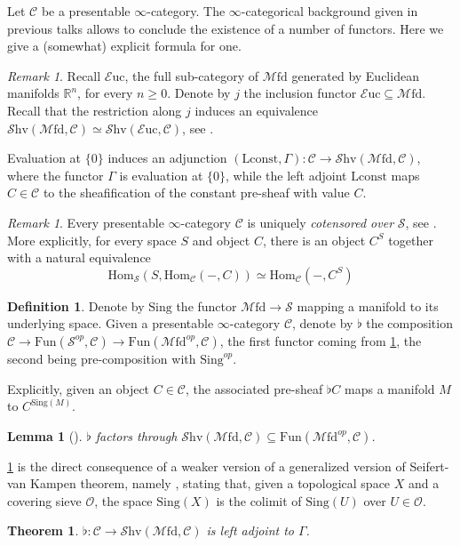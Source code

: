 \documentclass[10pt]{amsart}
\newcommand{\C}{\mathscr{C}}
\newcommand{\s}{\mathscr{S}}
\newcommand{\bR}{\mathbb{R}}
\newcommand{\Hom}{\mathrm{Hom}}
\newcommand{\Fun}{\mathrm{Fun}}
\newcommand{\Euc}{\mathscr{E}\mathrm{uc}}
\newcommand{\Mfd}{\mathscr{M}\mathrm{fd}}
\newcommand{\Shv}{\mathscr{S}\mathrm{hv}}
\newcommand{\Sing}{\mathrm{Sing}}
\newcommand{\const}{\mathrm{Lconst}}
\newtheorem{theorem}[equation]{Theorem}
\newtheorem{lemma}[equation]{Lemma}
\theoremstyle{definition}
\newtheorem{definition}[equation]{Definition}
\theoremstyle{remark}
\newtheorem{remark}[equation]{Remark}
\numberwithin{equation}{section}
\begin{document}
Let $\C$ be a presentable $\infty$-category. The $\infty$-categorical background given in previous talks allows to conclude the existence of a number of functors. Here we give a (somewhat) explicit formula for one. 
\begin{remark}
  Recall $\Euc$, the full sub-category of $\Mfd$ generated by Euclidean manifolds $\bR^n$, for every $n\geq0$. Denote by $j$ the inclusion functor $\Euc\subseteq\Mfd$. Recall that the restriction along $j$ induces an equivalence $\Shv(\Mfd,\C)\simeq\Shv(\Euc,\C)$, see \cite[Corollary A.5.6]{amabeldebrayhaine2021diffcoh}.
\end{remark}
Evaluation at $\{0\}$ induces an adjunction $(\const,\Gamma):\C\to\Shv(\Mfd,\C)$, where the functor $\Gamma$ is evaluation at $\{0\}$, while the left adjoint $\const$ maps $C\in\C$ to the sheafification of the constant pre-sheaf with value $C$. 
\begin{remark}\label{rmk:cotensor}
Every presentable $\infty$-category $\C$ is uniquely \emph{cotensored over} $\s$, see \cite[Remark 5.5.2.6]{lurie2009htt}. More explicitly, for every space $S$ and object $C$, there is an object $C^S$ together with a natural equivalence $$\Hom_\s(S,\Hom_\C(-,C))\simeq\Hom_\C(-,C^S)$$
\end{remark}
\begin{definition}
  Denote by $\Sing$ the functor $\Mfd\to\s$ mapping a manifold to its underlying space. Given a presentable $\infty$-category $\C$, denote by $\flat$ the composition $\C\to\Fun(\s^{op},\C)\to\Fun(\Mfd^{op},\C)$, the first functor coming from \cref{rmk:cotensor}, the second being pre-composition with $\Sing^{op}$.
\end{definition}
Explicitly, given an object $C\in\C$, the associated pre-sheaf $\flat C$ maps a manifold $M$ to $C^{\Sing(M)}$. 
\begin{lemma}[{\cite[Corollary 6.46]{bunkegepner2021differential}}]\label{lem:flatsheaf}
  $\flat$ factors through $\Shv(\Mfd,\C)\subseteq\Fun(\Mfd^{op},\C)$.
\end{lemma}
\cref{lem:flatsheaf} is the direct consequence of a weaker version of a generalized version of Seifert-van Kampen theorem, namely \cite[Proposition A.3.2]{lurie2017ha}, stating that, given a topological space $X$ and a covering sieve $\mathscr{O}$, the space $\Sing(X)$ is the colimit of $\Sing(U)$ over $U\in\mathscr{O}$.
\begin{theorem}\label{thm:leftadjoint}
  $\flat:\C\to\Shv(\Mfd,\C)$ is left adjoint to $\Gamma$.
\end{theorem}
\end{document}
